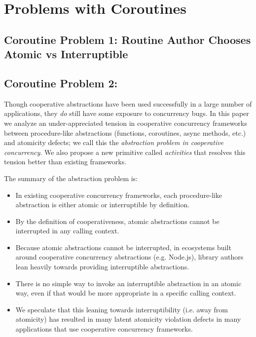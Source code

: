 \documentclass[a4paper,UKenglish,cleveref, autoref]{lipics-v2019}
\begin{document}
\section{Problems with Coroutines}





\subsection{Coroutine Problem 1: Routine Author Chooses Atomic vs Interruptible}

\subsection{Coroutine Problem 2:}























Though cooperative abstractions have been used successfully in a large number of applications, they \emph{do} still have some exposure to concurrency bugs.
In this paper we analyze an under-appreciated tension in cooperative concurrency frameworks between procedure-like abstractions (functions, coroutines, async methods, etc.) and atomicity defects; we call this the \emph{abstraction problem in cooperative concurrency}.
We also propose a new primitive called \emph{activities} that resolves this tension better than existing frameworks.

The summary of the abstraction problem is:

\begin{itemize}
\item In existing cooperative concurrency frameworks, each procedure-like abstraction is either atomic or interruptible by definition.
\item By the definition of cooperativeness, atomic abstractions cannot be interrupted in any calling context.
\item Because atomic abstractions cannot be interrupted, in ecosystems built around cooperative concurrency abstractions (e.g. Node.js), library authors lean heavily towards providing interruptible abstractions.
\item There is no simple way to invoke an interruptible abstraction in an atomic way, even if that would be more appropriate in a specific calling context.
\item We speculate that this leaning towards interruptibility (i.e. away from atomicity) has resulted in many latent atomicity violation defects in many applications that use cooperative concurrency frameworks.
\end{itemize}
\end{document}
